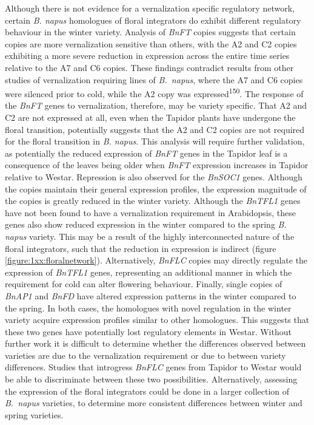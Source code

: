 \documentclass[12pt,]{book}
\begin{document}
Although there is not evidence for a vernalization specific regulatory
network, certain \emph{B. napus} homologues of floral integrators do
exhibit different regulatory behaviour in the winter variety. Analysis
of \emph{BnFT} copies suggests that certain copies are more
vernalization sensitive than others, with the A2 and C2 copies
exhibiting a more severe reduction in expression across the entire time
series relative to the A7 and C6 copies. These findings contradict
results from other studies of vernalization requiring lines of
\emph{B.~napus}, where the A7 and C6 copies were silenced prior to cold,
while the A2 copy was expressed\textsuperscript{150}. The response of
the \emph{BnFT} genes to vernalization, therefore, may be variety
specific. That A2 and C2 are not expressed at all, even when the Tapidor
plants have undergone the floral transition, potentially suggests that
the A2 and C2 copies are not required for the floral transition in
\emph{B. napus}. This analysis will require further validation, as
potentially the reduced expression of \emph{BnFT} genes in the Tapidor
leaf is a consequence of the leaves being older when \emph{BnFT}
expression increases in Tapidor relative to Westar. Repression is also
observed for the \emph{BnSOC1} genes. Although the copies maintain their
general expression profiles, the expression magnitude of the copies is
greatly reduced in the winter variety. Although the \emph{BnTFL1} genes
have not been found to have a vernalization requirement in Arabidopsis,
these genes also show reduced expression in the winter compared to the
spring \emph{B. napus} variety. This may be a result of the highly
interconnected nature of the floral integrators, such that the reduction
in expression is indirect (figure \ref{figure:1xx:floralnetwork}).
Alternatively, \emph{BnFLC} copies may directly regulate the expression
of \emph{BnTFL1} genes, representing an additional manner in which the
requirement for cold can alter flowering behaviour. Finally, single
copies of \emph{BnAP1} and \emph{BnFD} have altered expression patterns
in the winter compared to the spring. In both cases, the homologues with
novel regulation in the winter variety acquire expression profiles
similar to other homologues. This suggests that these two genes have
potentially lost regulatory elements in Westar. Without further work it
is difficult to determine whether the differences observed between
varieties are due to the vernalization requirement or due to between
variety differences. Studies that introgress \emph{BnFLC} genes from
Tapidor to Westar would be able to discriminate between these two
possibilities. Alternatively, assessing the expression of the floral
integrators could be done in a larger collection of \emph{B.~napus}
varieties, to determine more consistent differences between winter and
spring varieties.
\end{document}
